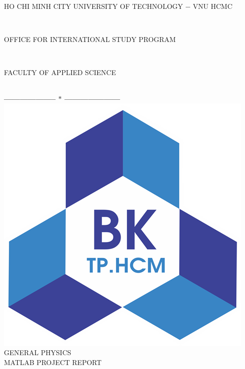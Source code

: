 \documentclass[13pt,a4paper]{report}
\begin{document}
\fontsize{13pt}{18pt}\selectfont
\begin{titlepage}
\thispagestyle{empty}
\thisfancypage{%
\setlength{\fboxsep}{0pt}%
\fbox}{} %
\

\begin{center}
\begin{large}
HO CHI MINH CITY UNIVERSITY OF TECHNOLOGY $-$ VNU HCMC
\end{large} \\
\begin{large}
OFFICE FOR INTERNATIONAL STUDY PROGRAM
\end{large} \\
\begin{large}
FACULTY OF APPLIED SCIENCE
\end{large} \\
\textbf{--------------------  $\ast$  ---------------------}\\[2.75cm]

\includegraphics[scale=1]{logoBK.png}\\[1cm]
{\fontsize{20pt}{1}\selectfont GENERAL PHYSICS}\\[1ex]
{\fontsize{20pt}{1}\selectfont MATLAB PROJECT REPORT}\\[2.75cm]
\end{center}


\end{titlepage}
\end{document}

